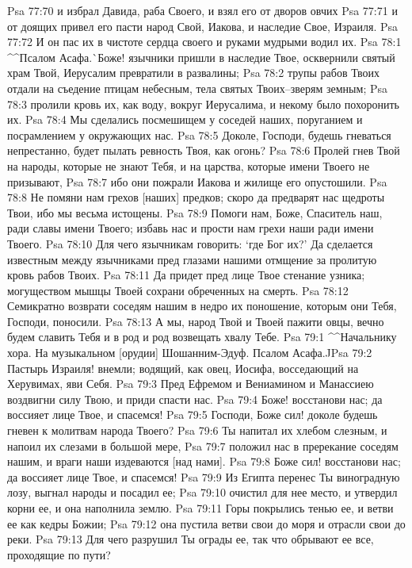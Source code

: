 Psa 77:70  и избрал Давида, раба Своего, и взял его от дворов овчих
Psa 77:71  и от доящих привел его пасти народ Свой, Иакова, и наследие Свое, Израиля.
Psa 77:72  И он пас их в чистоте сердца своего и руками мудрыми водил их.
Psa 78:1  ^^Псалом Асафа.^^ Боже! язычники пришли в наследие Твое, осквернили святый храм Твой, Иерусалим превратили в развалины;
Psa 78:2  трупы рабов Твоих отдали на съедение птицам небесным, тела святых Твоих--зверям земным;
Psa 78:3  пролили кровь их, как воду, вокруг Иерусалима, и некому было похоронить их.
Psa 78:4  Мы сделались посмешищем у соседей наших, поруганием и посрамлением у окружающих нас.
Psa 78:5  Доколе, Господи, будешь гневаться непрестанно, будет пылать ревность Твоя, как огонь?
Psa 78:6  Пролей гнев Твой на народы, которые не знают Тебя, и на царства, которые имени Твоего не призывают,
Psa 78:7  ибо они пожрали Иакова и жилище его опустошили.
Psa 78:8  Не помяни нам грехов [наших] предков; скоро да предварят нас щедроты Твои, ибо мы весьма истощены.
Psa 78:9  Помоги нам, Боже, Спаситель наш, ради славы имени Твоего; избавь нас и прости нам грехи наши ради имени Твоего.
Psa 78:10  Для чего язычникам говорить: `где Бог их?' Да сделается известным между язычниками пред глазами нашими отмщение за пролитую кровь рабов Твоих.
Psa 78:11  Да придет пред лице Твое стенание узника; могуществом мышцы Твоей сохрани обреченных на смерть.
Psa 78:12  Семикратно возврати соседям нашим в недро их поношение, которым они Тебя, Господи, поносили.
Psa 78:13  А мы, народ Твой и Твоей пажити овцы, вечно будем славить Тебя и в род и род возвещать хвалу Тебе.
Psa 79:1  ^^Начальнику хора. На музыкальном [орудии] Шошанним-Эдуф. Псалом Асафа.^^
Psa 79:2  Пастырь Израиля! внемли; водящий, как овец, Иосифа, восседающий на Херувимах, яви Себя.
Psa 79:3  Пред Ефремом и Вениамином и Манассиею воздвигни силу Твою, и приди спасти нас.
Psa 79:4  Боже! восстанови нас; да воссияет лице Твое, и спасемся!
Psa 79:5  Господи, Боже сил! доколе будешь гневен к молитвам народа Твоего?
Psa 79:6  Ты напитал их хлебом слезным, и напоил их слезами в большой мере,
Psa 79:7  положил нас в пререкание соседям нашим, и враги наши издеваются [над нами].
Psa 79:8  Боже сил! восстанови нас; да воссияет лице Твое, и спасемся!
Psa 79:9  Из Египта перенес Ты виноградную лозу, выгнал народы и посадил ее;
Psa 79:10  очистил для нее место, и утвердил корни ее, и она наполнила землю.
Psa 79:11  Горы покрылись тенью ее, и ветви ее как кедры Божии;
Psa 79:12  она пустила ветви свои до моря и отрасли свои до реки.
Psa 79:13  Для чего разрушил Ты ограды ее, так что обрывают ее все, проходящие по пути?
